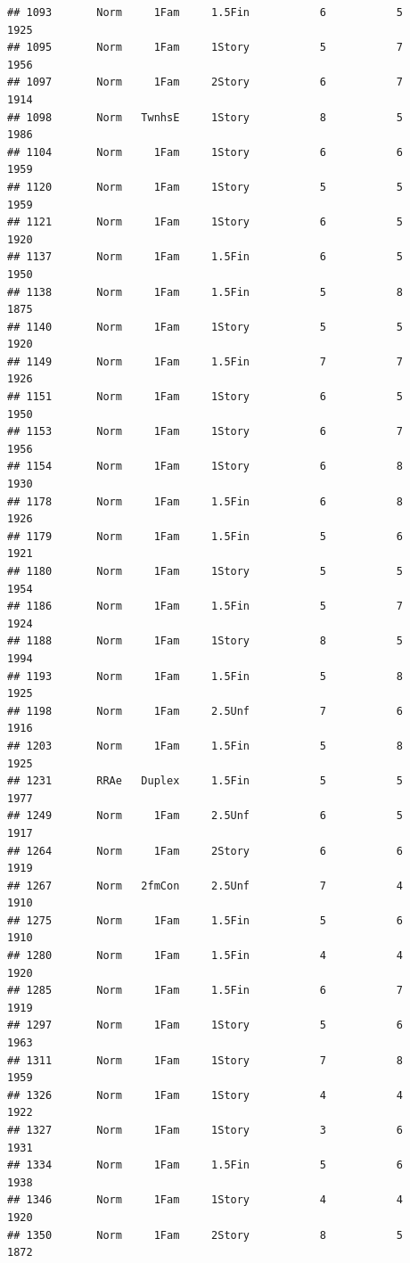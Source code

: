 \documentclass[]{article}
\begin{document}
\begin{verbatim}
## 1093       Norm     1Fam     1.5Fin           6           5      1925
## 1095       Norm     1Fam     1Story           5           7      1956
## 1097       Norm     1Fam     2Story           6           7      1914
## 1098       Norm   TwnhsE     1Story           8           5      1986
## 1104       Norm     1Fam     1Story           6           6      1959
## 1120       Norm     1Fam     1Story           5           5      1959
## 1121       Norm     1Fam     1Story           6           5      1920
## 1137       Norm     1Fam     1.5Fin           6           5      1950
## 1138       Norm     1Fam     1.5Fin           5           8      1875
## 1140       Norm     1Fam     1Story           5           5      1920
## 1149       Norm     1Fam     1.5Fin           7           7      1926
## 1151       Norm     1Fam     1Story           6           5      1950
## 1153       Norm     1Fam     1Story           6           7      1956
## 1154       Norm     1Fam     1Story           6           8      1930
## 1178       Norm     1Fam     1.5Fin           6           8      1926
## 1179       Norm     1Fam     1.5Fin           5           6      1921
## 1180       Norm     1Fam     1Story           5           5      1954
## 1186       Norm     1Fam     1.5Fin           5           7      1924
## 1188       Norm     1Fam     1Story           8           5      1994
## 1193       Norm     1Fam     1.5Fin           5           8      1925
## 1198       Norm     1Fam     2.5Unf           7           6      1916
## 1203       Norm     1Fam     1.5Fin           5           8      1925
## 1231       RRAe   Duplex     1.5Fin           5           5      1977
## 1249       Norm     1Fam     2.5Unf           6           5      1917
## 1264       Norm     1Fam     2Story           6           6      1919
## 1267       Norm   2fmCon     2.5Unf           7           4      1910
## 1275       Norm     1Fam     1.5Fin           5           6      1910
## 1280       Norm     1Fam     1.5Fin           4           4      1920
## 1285       Norm     1Fam     1.5Fin           6           7      1919
## 1297       Norm     1Fam     1Story           5           6      1963
## 1311       Norm     1Fam     1Story           7           8      1959
## 1326       Norm     1Fam     1Story           4           4      1922
## 1327       Norm     1Fam     1Story           3           6      1931
## 1334       Norm     1Fam     1.5Fin           5           6      1938
## 1346       Norm     1Fam     1Story           4           4      1920
## 1350       Norm     1Fam     2Story           8           5      1872

\end{verbatim}
\end{document}
